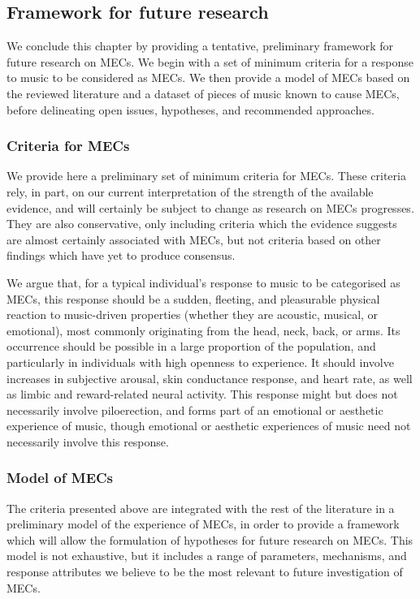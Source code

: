 \subsection{Framework for future research}
\label{se:rev-discussion-4}

We conclude this chapter by providing a tentative, preliminary framework for future research on MECs. We begin with a set of minimum criteria for a response to music to be considered as MECs. We then provide a model of MECs based on the reviewed literature and a dataset of pieces of music known to cause MECs, before delineating open issues, hypotheses, and recommended approaches.

\subsubsection{Criteria for MECs}

We provide here a preliminary set of minimum criteria for MECs. These criteria rely, in part, on our current interpretation of the strength of the available evidence, and will certainly be subject to change as research on MECs progresses. They are also conservative, only including criteria which the evidence suggests are almost certainly associated with MECs, but not criteria based on other findings which have yet to produce consensus.

We argue that, for a typical individual’s response to music to be categorised as MECs, this response should be a sudden, fleeting, and pleasurable physical reaction to music-driven properties (whether they are acoustic, musical, or emotional), most commonly originating from the head, neck, back, or arms. Its occurrence should be possible in a large proportion of the population, and particularly in individuals with high openness to experience. It should involve increases in subjective arousal, skin conductance response, and heart rate, as well as limbic and reward-related neural activity. This response might but does not necessarily involve piloerection, and forms part of an emotional or aesthetic experience of music, though emotional or aesthetic experiences of music need not necessarily involve this response.

\subsubsection{Model of MECs}

The criteria presented above are integrated with the rest of the literature in a preliminary model of the experience of MECs, in order to provide a framework which will allow the formulation of hypotheses for future research on MECs. This model is not exhaustive, but it includes a range of parameters, mechanisms, and response attributes we believe to be the most relevant to future investigation of MECs.


